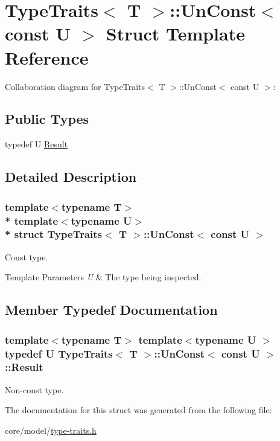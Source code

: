 \hypertarget{structTypeTraits_1_1UnConst_3_01const_01U_01_4}{}\section{Type\+Traits$<$ T $>$\+:\+:Un\+Const$<$ const U $>$ Struct Template Reference}
\label{structTypeTraits_1_1UnConst_3_01const_01U_01_4}


Collaboration diagram for Type\+Traits$<$ T $>$\+:\+:Un\+Const$<$ const U $>$\+:
\subsection*{Public Types}
\begin{DoxyCompactItemize}
\item 
typedef U \hyperlink{structTypeTraits_1_1UnConst_3_01const_01U_01_4_af10ba94a73043f035bb0571423bc0da9}{Result}
\end{DoxyCompactItemize}


\subsection{Detailed Description}
\subsubsection*{template$<$typename T$>$\\*
template$<$typename U$>$\\*
struct Type\+Traits$<$ T $>$\+::\+Un\+Const$<$ const U $>$}

Const type. 
\begin{DoxyTemplParams}{Template Parameters}
{\em U} & The type being inspected. \\
\hline
\end{DoxyTemplParams}


\subsection{Member Typedef Documentation}
\subsubsection[{\texorpdfstring{Result}{Result}}]{\setlength{\rightskip}{0pt plus 5cm}template$<$typename T$>$ template$<$typename U $>$ typedef U {\bf Type\+Traits}$<$ T $>$\+::{\bf Un\+Const}$<$ const U $>$\+::{\bf Result}}\hypertarget{structTypeTraits_1_1UnConst_3_01const_01U_01_4_af10ba94a73043f035bb0571423bc0da9}{}\label{structTypeTraits_1_1UnConst_3_01const_01U_01_4_af10ba94a73043f035bb0571423bc0da9}
Non-\/const type. 

The documentation for this struct was generated from the following file\+:\begin{DoxyCompactItemize}
\item 
core/model/\hyperlink{type-traits_8h}{type-\/traits.\+h}\end{DoxyCompactItemize}
